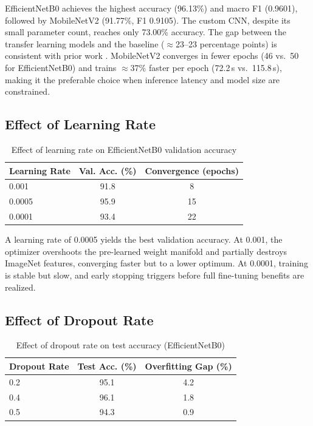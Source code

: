 \documentclass[10pt,twocolumn]{article}
\begin{document}
EfficientNetB0 achieves the highest accuracy (96.13\%) and macro F1 (0.9601), followed by MobileNetV2 (91.77\%, F1 0.9105). The custom CNN, despite its small parameter count, reaches only 73.00\% accuracy. The gap between the transfer learning models and the baseline ($\approx$23--23 percentage points) is consistent with prior work \cite{Tiwari2021, Ayan2024}. MobileNetV2 converges in fewer epochs (46 vs.\ 50 for EfficientNetB0) and trains $\approx$37\% faster per epoch (72.2\,s vs.\ 115.8\,s), making it the preferable choice when inference latency and model size are constrained.

\subsection{Effect of Learning Rate}

\begin{table}[H]
\centering
\caption{Effect of learning rate on EfficientNetB0 validation accuracy}
\label{tab:lr}
\begin{tabular}{lcc}
\toprule
\textbf{Learning Rate} & \textbf{Val. Acc. (\%)} & \textbf{Convergence (epochs)} \\
\midrule
0.001  & 91.8 & 8 \\
0.0005 & 95.9 & 15 \\
0.0001 & 93.4 & 22 \\
\bottomrule
\end{tabular}
\end{table}

A learning rate of 0.0005 yields the best validation accuracy. At 0.001, the optimizer overshoots the pre-learned weight manifold and partially destroys ImageNet features, converging faster but to a lower optimum. At 0.0001, training is stable but slow, and early stopping triggers before full fine-tuning benefits are realized.

\subsection{Effect of Dropout Rate}

\begin{table}[H]
\centering
\caption{Effect of dropout rate on test accuracy (EfficientNetB0)}
\label{tab:dropout}
\begin{tabular}{lcc}
\toprule
\textbf{Dropout Rate} & \textbf{Test Acc. (\%)} & \textbf{Overfitting Gap (\%)} \\
\midrule
0.2 & 95.1 & 4.2 \\
0.4 & 96.1 & 1.8 \\
0.5 & 94.3 & 0.9 \\
\bottomrule
\end{tabular}
\end{table}
\end{document}
